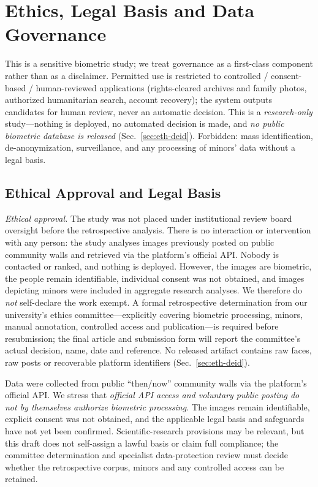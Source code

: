 \documentclass[journal]{IEEEtran}
\begin{document}
\section{Ethics, Legal Basis and Data Governance}\label{sec:ethics}
This is a sensitive biometric study; we treat governance as a first-class component rather than as a disclaimer. Permitted use is restricted to controlled / consent-based / human-reviewed applications (rights-cleared archives and family photos, authorized humanitarian search, account recovery); the system outputs candidates for human review, never an automatic decision. This is a \emph{research-only} study---nothing is deployed, no automated decision is made, and \emph{no public biometric database is released} (Sec.~\ref{sec:eth-deid}). Forbidden: mass identification, de-anonymization, surveillance, and any processing of minors' data without a legal basis.

\subsection{Ethical Approval and Legal Basis}\label{sec:eth-legal}
\emph{Ethical approval.} The study was not placed under institutional review board oversight before the retrospective analysis. There is no interaction or intervention with any person: the study analyses images previously posted on public community walls and retrieved via the platform's official API. Nobody is contacted or ranked, and nothing is deployed. However, the images are biometric, the people remain identifiable, individual consent was not obtained, and images depicting minors were included in aggregate research analyses. We therefore do \emph{not} self-declare the work exempt. A formal retrospective determination from our university's ethics committee---explicitly covering biometric processing, minors, manual annotation, controlled access and publication---is required before resubmission; the final article and submission form will report the committee's actual decision, name, date and reference. No released artifact contains raw faces, raw posts or recoverable platform identifiers (Sec.~\ref{sec:eth-deid}).

Data were collected from public ``then/now'' community walls via the platform's official API. We stress that \emph{official API access and voluntary public posting do not by themselves authorize biometric processing.} The images remain identifiable, explicit consent was not obtained, and the applicable legal basis and safeguards have not yet been confirmed. Scientific-research provisions may be relevant, but this draft does not self-assign a lawful basis or claim full compliance; the committee determination and specialist data-protection review must decide whether the retrospective corpus, minors and any controlled access can be retained.
\end{document}
